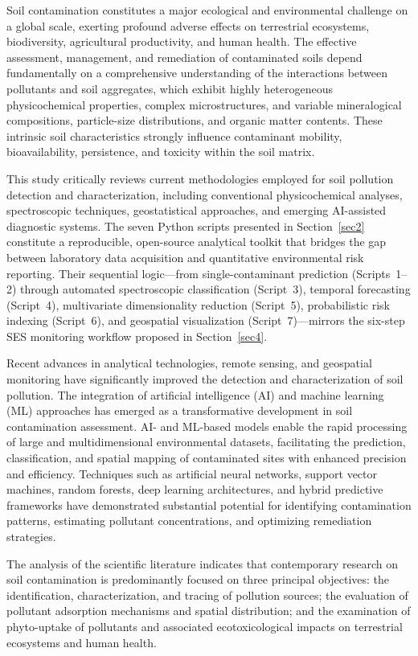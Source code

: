 \documentclass[environments,article,submit,pdftex,moreauthors]{Definitions/mdpi}
\begin{document}
Soil contamination constitutes a major ecological and environmental challenge
on a global scale, exerting profound adverse effects on terrestrial
ecosystems, biodiversity, agricultural productivity, and human health. The
effective assessment, management, and remediation of contaminated soils depend
fundamentally on a comprehensive understanding of the interactions between
pollutants and soil aggregates, which exhibit highly heterogeneous
physicochemical properties, complex microstructures, and variable mineralogical
compositions, particle-size distributions, and organic matter contents. These
intrinsic soil characteristics strongly influence contaminant mobility,
bioavailability, persistence, and toxicity within the soil matrix.

This study critically reviews current methodologies employed for soil pollution
detection and characterization, including conventional physicochemical
analyses, spectroscopic techniques, geostatistical approaches, and emerging
AI-assisted diagnostic systems. The seven Python scripts presented in
Section~\ref{sec2} constitute a reproducible, open-source analytical toolkit
that bridges the gap between laboratory data acquisition and quantitative
environmental risk reporting. Their sequential logic---from single-contaminant
prediction (Scripts~1--2) through automated spectroscopic classification
(Script~3), temporal forecasting (Script~4), multivariate dimensionality
reduction (Script~5), probabilistic risk indexing (Script~6), and geospatial
visualization (Script~7)---mirrors the six-step SES monitoring workflow
proposed in Section~\ref{sec4}.

Recent advances in analytical technologies, remote sensing, and geospatial
monitoring have significantly improved the detection and characterization of
soil pollution. The integration of artificial intelligence (AI) and machine
learning (ML) approaches has emerged as a transformative development in soil
contamination assessment. AI- and ML-based models enable the rapid processing
of large and multidimensional environmental datasets, facilitating the
prediction, classification, and spatial mapping of contaminated sites with
enhanced precision and efficiency. Techniques such as artificial neural
networks, support vector machines, random forests, deep learning architectures,
and hybrid predictive frameworks have demonstrated substantial potential for
identifying contamination patterns, estimating pollutant concentrations, and
optimizing remediation strategies.

The analysis of the scientific literature indicates that contemporary research
on soil contamination is predominantly focused on three principal objectives:
the identification, characterization, and tracing of pollution sources; the
evaluation of pollutant adsorption mechanisms and spatial distribution; and the
examination of phyto-uptake of pollutants and associated ecotoxicological
impacts on terrestrial ecosystems and human health.
\end{document}
